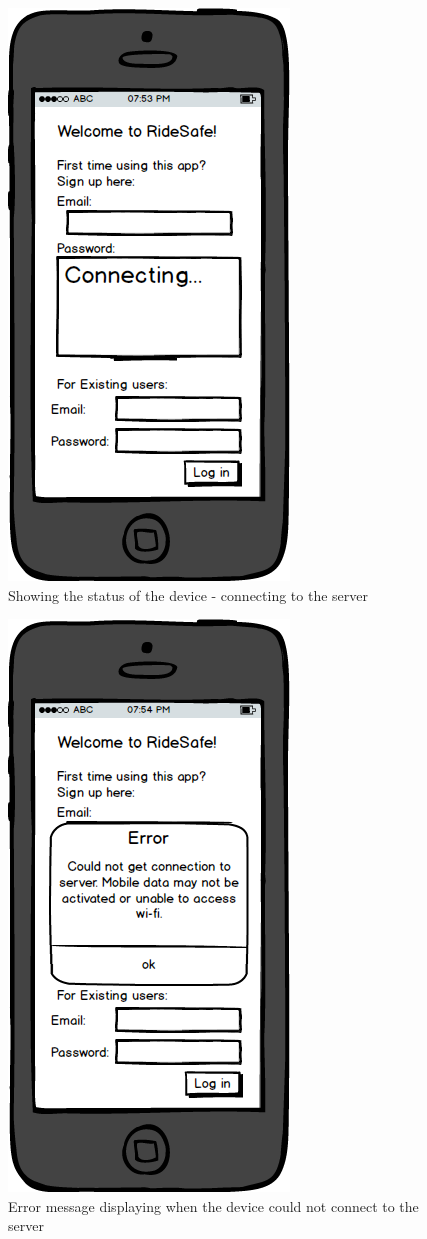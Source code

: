 \documentclass[a4paper]{report}
\begin{document}
\clearpage
\begin{figure}
\centering
\includegraphics[scale=0.9]{figures/prototype_2/connecting}
\caption{Showing the status of the device - connecting to the server}
\end{figure}
\clearpage
\begin{figure}
\centering
\includegraphics[scale=0.9]{figures/prototype_2/connect_err}
\caption{Error message displaying when the device could not connect to the server}
\end{figure}
\end{document}
